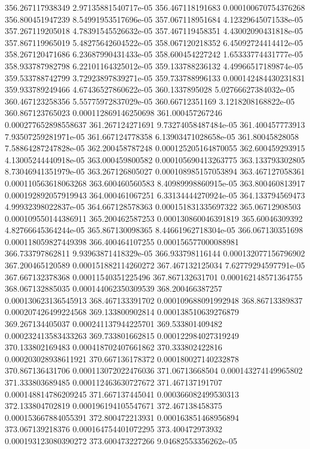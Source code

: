 {356.267117938349 2.97135881540717e-05
356.467118191683 0.000100670754376268
356.800451947239 8.54991953517696e-05
357.067118951684 4.12329645071538e-05
357.267119205018 4.78391545526632e-05
357.467119458351 4.43002090431818e-05
357.867119965019 5.48275642604522e-05
358.067120218352 6.45092724414412e-05
358.267120471686 6.23687990431433e-05
358.600454227242 1.65333774431777e-05
358.933787982798 6.22101164325012e-05
359.133788236132 4.49966517189874e-05
359.533788742799 3.72923897839271e-05
359.733788996133 0.000142484430231831
359.933789249466 4.67436527860622e-05
360.1337895028 5.02766627384032e-05
360.467123258356 5.55775972837029e-05
360.66712351169 3.1218208168822e-05
360.867123765023 0.000112869146250698
361.000457267246 0.000277652898558637
361.267124271691 9.73274058487484e-05
361.400457773913 7.93507259281971e-05
361.667124778358 6.13903471028658e-05
361.80045828058 7.58864287247828e-05
362.200458787248 0.000125205164870055
362.600459293915 4.13005244440918e-05
363.000459800582 0.000105690413263775
363.133793302805 8.73046941351979e-05
363.267126805027 0.000108985157053894
363.467127058361 0.000110563618063268
363.600460560583 8.40989998860915e-05
363.800460813917 0.000192892057919943
364.000461067251 6.33134444270924e-05
364.133794569473 4.99932398022837e-05
364.667128578363 0.000151831335697322
365.06712908503 0.000109550144386911
365.200462587253 0.000130860046391819
365.60046309392 4.82766645364244e-05
365.867130098365 8.44661962718304e-05
366.067130351698 0.000118059827449398
366.400464107255 0.000156577000088981
366.733797862811 9.93963871418329e-05
366.933798116144 0.000132077156796902
367.200465120589 0.000151882114260272
367.467132125034 7.62779294597791e-05
367.667132378368 0.00011540351225496
367.867132631701 0.000162148571364755
368.067132885035 0.000144062350309539
368.200466387257 0.000130623136545913
368.467133391702 0.000109688091992948
368.86713389837 0.000207426499224568
369.133800902814 0.000138510639276879
369.267134405037 0.000241137944225701
369.533801409482 0.000232413583433263
369.733801662815 0.000122984027319249
370.133802169483 0.000418702407661862
370.333802422816 0.000203028938611921
370.667136178372 0.000180027140232878
370.867136431706 0.000113072022476036
371.06713668504 0.000143274149965802
371.333803689485 0.000112463630727672
371.467137191707 0.000148814786209245
371.667137445041 0.000366082499530313
372.133804702819 0.000196194105547671
372.467138458375 0.000153667884055391
372.800472213931 0.000163851468956894
373.067139218376 0.000164754401072295
373.400472973932 0.000193123080390272
373.600473227266 9.04682553356262e-05
}
